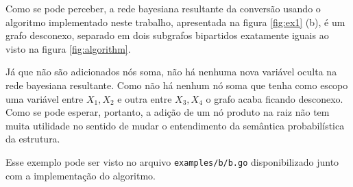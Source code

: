 Como se pode perceber, a rede bayesiana resultante da conversão usando o algoritmo implementado neste trabalho, apresentada na figura \ref{fig:ex1} (b), é um grafo desconexo, separado em dois subgrafos bipartidos exatamente iguais ao visto na figura \ref{fig:algorithm}.

Já que não são adicionados nós soma, não há nenhuma nova variável oculta na rede bayesiana resultante. Como não há nenhum nó soma que tenha como escopo uma variável entre $X_1, X_2$ e outra entre $X_3, X_4$ o grafo acaba ficando desconexo. Como se pode esperar, portanto, a adição de um nó produto na raiz não tem muita utilidade no sentido de mudar o entendimento da semântica probabilística da estrutura.

Esse exemplo pode ser visto no arquivo {\tt examples/b/b.go} disponibilizado junto com a implementação do algoritmo.


